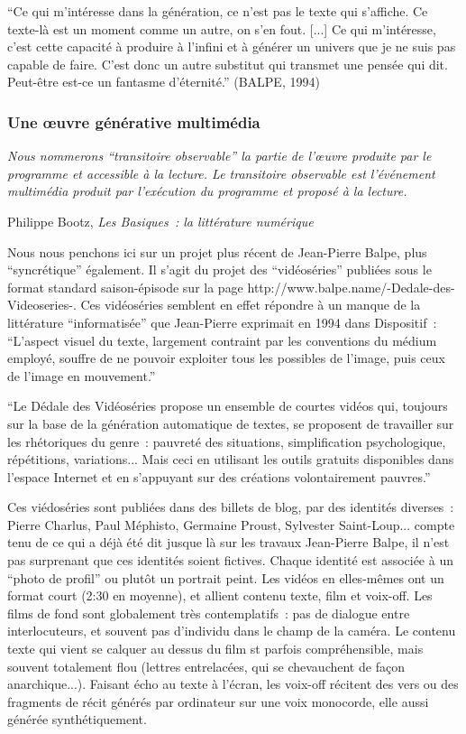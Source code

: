 \documentclass{article}
\newenvironment{citationbox}
{\begin{center}
		\begin{minipage}{.8\textwidth}
		}
		{
		\end{minipage}	
\end{center}
}
\begin{document}
				
				``Ce qui m’intéresse dans la génération, ce n’est pas le texte qui s’affiche. Ce texte-là est
				un moment comme un autre, on s’en fout. [...] Ce qui m’intéresse, c’est cette capacité à
				produire à l’infini et à générer un univers que je ne suis pas capable de faire. C’est donc un
				autre substitut qui transmet une pensée qui dit. Peut-être est-ce un fantasme d’éternité.''
				(BALPE, 1994)
				
			\subsubsection{Une œuvre générative multimédia}
				\begin{citationbox}
					\textit{Nous nommerons ``transitoire observable'' la partie de l’œuvre produite par le programme et accessible à la lecture. Le transitoire observable est l’événement multimédia produit par l'exécution du programme et proposé à la lecture.}
					\begin{flushright}
						Philippe Bootz, \textit{Les Basiques~: la littérature numérique} \cite{bootz2006}
					\end{flushright}
				\end{citationbox}
				Nous nous penchons ici sur un projet plus récent de Jean-Pierre Balpe, plus ``syncrétique'' également. Il s'agit du projet des ``vidéoséries'' publiées sous le format standard saison-épisode sur la page http://www.balpe.name/-Dedale-des-Videoseries-. Ces vidéoséries semblent en effet répondre à un manque de la littérature ``informatisée'' que Jean-Pierre exprimait en 1994 dans Dispositif : 
				``L'aspect visuel du texte, largement contraint par les conventions du médium employé, souffre de ne pouvoir exploiter tous les possibles de l'image, puis ceux de l'image en mouvement.''
				
				``Le Dédale des Vidéoséries propose un ensemble de courtes vidéos qui, toujours sur la base de la génération automatique de textes, se proposent de travailler sur les rhétoriques du genre : pauvreté des situations, simplification psychologique, répétitions, variations... Mais ceci en utilisant les outils gratuits disponibles dans l'espace Internet et en s'appuyant sur des créations volontairement pauvres.''
				
				Ces  viédoséries sont publiées dans des billets de blog, par des identités diverses : Pierre Charlus, Paul Méphisto, Germaine Proust, Sylvester Saint-Loup... compte tenu de ce qui a déjà été dit jusque là sur les travaux Jean-Pierre Balpe, il n'est pas surprenant que ces identités soient fictives.    Chaque identité est associée à un ``photo de profil'' ou plutôt un portrait peint. Les vidéos en elles-mêmes ont un format court (2:30 en moyenne), et allient contenu texte, film et voix-off.
				Les films de fond sont globalement très contemplatifs : pas de dialogue entre interlocuteurs, et souvent pas d'individu dans le champ de la caméra. Le contenu texte qui vient se calquer au dessus du film st parfois compréhensible, mais souvent totalement flou (lettres entrelacées, qui se chevauchent de façon anarchique...). Faisant écho au texte à l'écran, les voix-off récitent des vers ou des fragments de récit générés par ordinateur sur une voix monocorde, elle aussi générée synthétiquement.
				
\end{document}
